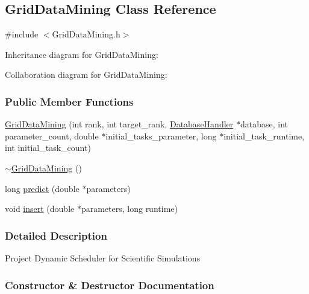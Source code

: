 \hypertarget{a00019}{}\subsection{Grid\+Data\+Mining Class Reference}
\label{a00019}


{\ttfamily \#include $<$Grid\+Data\+Mining.\+h$>$}



Inheritance diagram for Grid\+Data\+Mining\+:


Collaboration diagram for Grid\+Data\+Mining\+:
\subsubsection*{Public Member Functions}
\begin{DoxyCompactItemize}
\item 
\hyperlink{a00019_aa27e608733c28e133633813924f39d7b}{Grid\+Data\+Mining} (int rank, int target\+\_\+rank, \hyperlink{a00011}{Database\+Handler} $\ast$database, int parameter\+\_\+count, double $\ast$initial\+\_\+tasks\+\_\+parameter, long $\ast$initial\+\_\+task\+\_\+runtime, int initial\+\_\+task\+\_\+count)
\item 
\hyperlink{a00019_a9cfa6df12c31316f2e978e76aab1c63d}{$\sim$\+Grid\+Data\+Mining} ()
\item 
long \hyperlink{a00019_a8aef1fbc6d1f034660efee2878f2efe2}{predict} (double $\ast$parameters)
\item 
void \hyperlink{a00019_a864374110fb8c1673c057f524776ff97}{insert} (double $\ast$parameters, long runtime)
\end{DoxyCompactItemize}


\subsubsection{Detailed Description}
Project Dynamic Scheduler for Scientific Simulations 

\subsubsection{Constructor \& Destructor Documentation}
\hypertarget{a00019_aa27e608733c28e133633813924f39d7b}{}
